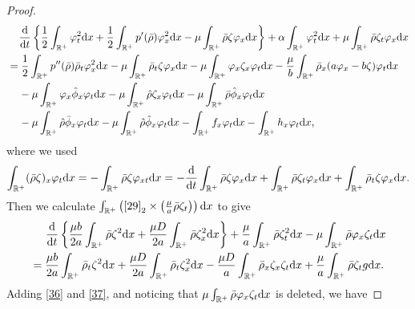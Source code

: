 \documentclass[11pt]{article}
\theoremstyle{plain}
\numberwithin{equation}{section}
\begin{document}
\begin{proof}
		\begin{align}\label{36}
			&\;\;\;\;	\frac{{\rm d}}{{\rm d}t}\left\{\frac{1}{2}\int_{\mathbb{R}^+}\varphi_t^2{\rm d}x+\frac{1}{2}\int_{\mathbb{R}^+}p^{\prime}(\bar\rho)\varphi_x^2{\rm d}x-\mu\int_{\mathbb{R}^+}\bar\rho\zeta\varphi_x{\rm d}x\right\}+\alpha\int_{\mathbb{R}^+}\varphi_t^2{\rm d}x+\mu\int_{\mathbb{R}^+}\bar\rho\zeta_t\varphi_x{\rm d}x\notag\\
			&=\frac{1}{2}\int_{\mathbb{R}^+}p^{\prime\prime}(\bar\rho)\bar\rho_t\varphi_x^2{\rm d}x-\mu\int_{\mathbb{R}^+}\bar\rho_t\zeta\varphi_x{\rm d}x-\mu\int_{\mathbb{R}^+}\varphi_x\zeta_x\varphi_t{\rm d}x-\frac{\mu}{b}\int_{\mathbb{R}^+}\bar\rho_x(a\varphi_x-b\zeta)\varphi_t{\rm d}x\notag\\
			&\;\;\;\;-\mu\int_{\mathbb{R}^+}\varphi_x\hat\phi_x\varphi_t{\rm d}x-\mu\int_{\mathbb{R}^+}\hat\rho\zeta_x\varphi_t{\rm d}x-\mu\int_{\mathbb{R}^+}\bar\rho\hat\phi_x\varphi_t{\rm d}x\notag\\
			&\;\;\;\;-\mu\int_{\mathbb{R}^+}\hat\rho\bar\phi_x\varphi_t{\rm d}x-\mu\int_{\mathbb{R}^+}\hat\rho\hat\phi_x\varphi_t{\rm d}x-\int_{\mathbb{R}^+}f_x\varphi_t{\rm d}x-\int_{\mathbb{R}^+}h_x\varphi_t{\rm d}x,
		\end{align}
		where we used 
		\begin{align}\notag
		\int_{\mathbb{R}^+}(\bar\rho\zeta)_x\varphi_t{\rm d}x=-\int_{\mathbb{R}^+}\bar\rho\zeta\varphi_{xt}{\rm d}x=-\frac{{\rm d}}{{\rm d}t}\int_{\mathbb{R}^+}\bar\rho\zeta\varphi_{x}{\rm d}x+\int_{\mathbb{R}^+}\bar\rho\zeta_t\varphi_x{\rm d}x+\int_{\mathbb{R}^+}\bar\rho_t\zeta\varphi_x{\rm d}x.	
		\end{align}
		Then we calculate
		$\int_{\mathbb{R}^+}\left(\eqref{29}_2\times\left(\frac{\mu}{a}\bar\rho\zeta_t\right)\right){\rm d}x$ to give
		\begin{align}\label{37}
			&\;\;\;\;\;	\frac{{\rm d}}{{\rm d}t}\left\{\frac{\mu b}{2a}\int_{\mathbb{R}^+}^{}\bar\rho\zeta^2{\rm d}x+\frac{\mu D}{2a}\int_{\mathbb{R}^+}^{}\bar\rho\zeta_x^2{\rm d}x\right\}
			+\frac{\mu}{a}\int_{\mathbb{R}^+}^{}\bar\rho\zeta_t^2{\rm d}x-\mu\int_{\mathbb{R}^+}^{}\bar\rho\varphi_x\zeta_t {\rm d}x\notag\\
			&=\frac{\mu b}{2a}\int_{\mathbb{R}^+}^{}\bar\rho_t\zeta^2{\rm d}x+\frac{\mu D}{2a}\int_{\mathbb{R}^+}^{}\bar\rho_t\zeta_x^2{\rm d}x
			-\frac{\mu D}{a}\int_{\mathbb{R}^+}^{}\bar\rho_x\zeta_x\zeta_t {\rm d}x+\frac{\mu}{a}\int_{\mathbb{R}^+}^{}\bar\rho\zeta_tg {\rm d}x.
		\end{align}
		Adding \eqref{36} and \eqref{37}, and noticing that $\mu\int_{\mathbb{R}^+}^{}\bar\rho\varphi_x\zeta_t {\rm d}x$ is deleted, we have

\end{proof}
\end{document}
